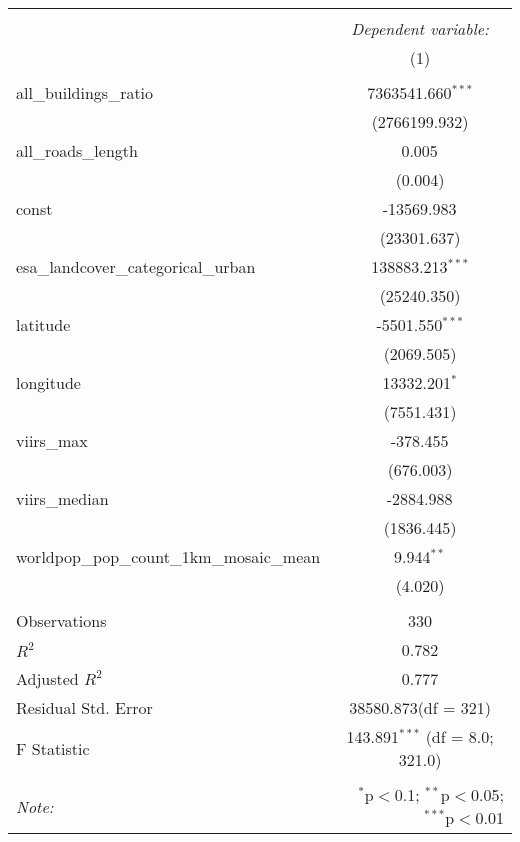 \begin{table}[!htbp] \centering
\begin{tabular}{@{\extracolsep{5pt}}lc}
\\[-1.8ex]\hline
\hline \\[-1.8ex]
& \multicolumn{1}{c}{\textit{Dependent variable:}} \
\cr \cline{1-2}
\\[-1.8ex] & (1) \\
\hline \\[-1.8ex]
 all_buildings_ratio & 7363541.660$^{***}$ \\
  & (2766199.932) \\
 all_roads_length & 0.005$^{}$ \\
  & (0.004) \\
 const & -13569.983$^{}$ \\
  & (23301.637) \\
 esa_landcover_categorical_urban & 138883.213$^{***}$ \\
  & (25240.350) \\
 latitude & -5501.550$^{***}$ \\
  & (2069.505) \\
 longitude & 13332.201$^{*}$ \\
  & (7551.431) \\
 viirs_max & -378.455$^{}$ \\
  & (676.003) \\
 viirs_median & -2884.988$^{}$ \\
  & (1836.445) \\
 worldpop_pop_count_1km_mosaic_mean & 9.944$^{**}$ \\
  & (4.020) \\
\hline \\[-1.8ex]
 Observations & 330 \\
 $R^2$ & 0.782 \\
 Adjusted $R^2$ & 0.777 \\
 Residual Std. Error & 38580.873(df = 321)  \\
 F Statistic & 143.891$^{***}$ (df = 8.0; 321.0) \\
\hline
\hline \\[-1.8ex]
\textit{Note:} & \multicolumn{1}{r}{$^{*}$p$<$0.1; $^{**}$p$<$0.05; $^{***}$p$<$0.01} \\
\end{tabular}
\end{table}